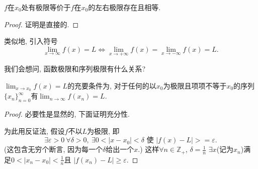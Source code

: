 \begin{proposition}
    $f$在$x_0$处有极限等价于$f$在$x_0$的左右极限存在且相等.
\end{proposition}
\begin{proof}
    证明是直接的.
\end{proof}
类似地, 引入符号
\begin{equation}
  \lim_{x \to \infty} f(x) = L \iff \lim_{x \to +\infty} f(x) = \lim_{x \to -\infty} f(x) = L.
\end{equation}

我们会想问, 函数极限和序列极限有什么关系?
\begin{theorem}[Heine]
    $\displaystyle \lim_{x \to x_0}f(x) = L$的充要条件为, 对于任何的以$x_0$为极限且项项不等于$x_0$的序列$\{ x_n \}_{n=0}^{\infty}$有$\displaystyle \lim_{n \to \infty}f(x_n) = L$.
\end{theorem}
\begin{proof}
    必要性是显然的, 下面证明充分性.

    为此用反证法, 假设$f$不以$L$为极限, 即
    \begin{equation}
      \exists \varepsilon > 0 \ \forall \delta > 0, \ \exists 0< |x-x_0| < \delta \text{ 使 } |f(x) - L| > =\varepsilon . 
    \end{equation}
    (这包含无穷个断言, 因为每一个$\delta$给出一个$x$.)
    这样$\forall n \in \mathbb{Z}_{+}$, $\delta = \frac{1}{n}$ $\exists x$(记为$x_n$)满足$0 < |x_n - x_0| < \frac{1}{n}$且
    $|f(x_n) - L| \ge \varepsilon$.
\end{proof}